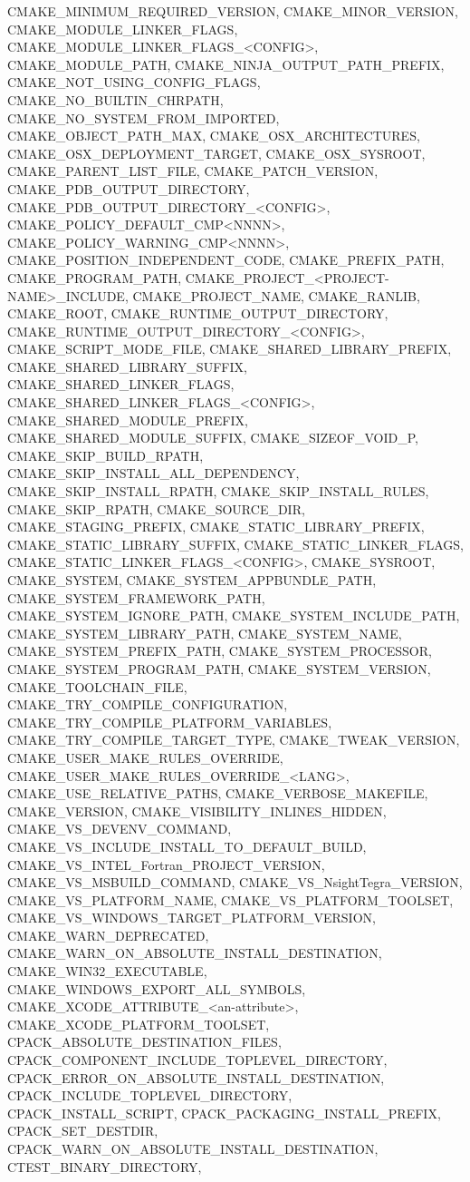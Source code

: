 {{CMAKE_MINIMUM_REQUIRED_VERSION,
CMAKE_MINOR_VERSION,
CMAKE_MODULE_LINKER_FLAGS,
CMAKE_MODULE_LINKER_FLAGS_<CONFIG>,
CMAKE_MODULE_PATH,
CMAKE_NINJA_OUTPUT_PATH_PREFIX,
CMAKE_NOT_USING_CONFIG_FLAGS,
CMAKE_NO_BUILTIN_CHRPATH,
CMAKE_NO_SYSTEM_FROM_IMPORTED,
CMAKE_OBJECT_PATH_MAX,
CMAKE_OSX_ARCHITECTURES,
CMAKE_OSX_DEPLOYMENT_TARGET,
CMAKE_OSX_SYSROOT,
CMAKE_PARENT_LIST_FILE,
CMAKE_PATCH_VERSION,
CMAKE_PDB_OUTPUT_DIRECTORY,
CMAKE_PDB_OUTPUT_DIRECTORY_<CONFIG>,
CMAKE_POLICY_DEFAULT_CMP<NNNN>,
CMAKE_POLICY_WARNING_CMP<NNNN>,
CMAKE_POSITION_INDEPENDENT_CODE,
CMAKE_PREFIX_PATH,
CMAKE_PROGRAM_PATH,
CMAKE_PROJECT_<PROJECT-NAME>_INCLUDE,
CMAKE_PROJECT_NAME,
CMAKE_RANLIB,
CMAKE_ROOT,
CMAKE_RUNTIME_OUTPUT_DIRECTORY,
CMAKE_RUNTIME_OUTPUT_DIRECTORY_<CONFIG>,
CMAKE_SCRIPT_MODE_FILE,
CMAKE_SHARED_LIBRARY_PREFIX,
CMAKE_SHARED_LIBRARY_SUFFIX,
CMAKE_SHARED_LINKER_FLAGS,
CMAKE_SHARED_LINKER_FLAGS_<CONFIG>,
CMAKE_SHARED_MODULE_PREFIX,
CMAKE_SHARED_MODULE_SUFFIX,
CMAKE_SIZEOF_VOID_P,
CMAKE_SKIP_BUILD_RPATH,
CMAKE_SKIP_INSTALL_ALL_DEPENDENCY,
CMAKE_SKIP_INSTALL_RPATH,
CMAKE_SKIP_INSTALL_RULES,
CMAKE_SKIP_RPATH,
CMAKE_SOURCE_DIR,
CMAKE_STAGING_PREFIX,
CMAKE_STATIC_LIBRARY_PREFIX,
CMAKE_STATIC_LIBRARY_SUFFIX,
CMAKE_STATIC_LINKER_FLAGS,
CMAKE_STATIC_LINKER_FLAGS_<CONFIG>,
CMAKE_SYSROOT,
CMAKE_SYSTEM,
CMAKE_SYSTEM_APPBUNDLE_PATH,
CMAKE_SYSTEM_FRAMEWORK_PATH,
CMAKE_SYSTEM_IGNORE_PATH,
CMAKE_SYSTEM_INCLUDE_PATH,
CMAKE_SYSTEM_LIBRARY_PATH,
CMAKE_SYSTEM_NAME,
CMAKE_SYSTEM_PREFIX_PATH,
CMAKE_SYSTEM_PROCESSOR,
CMAKE_SYSTEM_PROGRAM_PATH,
CMAKE_SYSTEM_VERSION,
CMAKE_TOOLCHAIN_FILE,
CMAKE_TRY_COMPILE_CONFIGURATION,
CMAKE_TRY_COMPILE_PLATFORM_VARIABLES,
CMAKE_TRY_COMPILE_TARGET_TYPE,
CMAKE_TWEAK_VERSION,
CMAKE_USER_MAKE_RULES_OVERRIDE,
CMAKE_USER_MAKE_RULES_OVERRIDE_<LANG>,
CMAKE_USE_RELATIVE_PATHS,
CMAKE_VERBOSE_MAKEFILE,
CMAKE_VERSION,
CMAKE_VISIBILITY_INLINES_HIDDEN,
CMAKE_VS_DEVENV_COMMAND,
CMAKE_VS_INCLUDE_INSTALL_TO_DEFAULT_BUILD,
CMAKE_VS_INTEL_Fortran_PROJECT_VERSION,
CMAKE_VS_MSBUILD_COMMAND,
CMAKE_VS_NsightTegra_VERSION,
CMAKE_VS_PLATFORM_NAME,
CMAKE_VS_PLATFORM_TOOLSET,
CMAKE_VS_WINDOWS_TARGET_PLATFORM_VERSION,
CMAKE_WARN_DEPRECATED,
CMAKE_WARN_ON_ABSOLUTE_INSTALL_DESTINATION,
CMAKE_WIN32_EXECUTABLE,
CMAKE_WINDOWS_EXPORT_ALL_SYMBOLS,
CMAKE_XCODE_ATTRIBUTE_<an-attribute>,
CMAKE_XCODE_PLATFORM_TOOLSET,
CPACK_ABSOLUTE_DESTINATION_FILES,
CPACK_COMPONENT_INCLUDE_TOPLEVEL_DIRECTORY,
CPACK_ERROR_ON_ABSOLUTE_INSTALL_DESTINATION,
CPACK_INCLUDE_TOPLEVEL_DIRECTORY,
CPACK_INSTALL_SCRIPT,
CPACK_PACKAGING_INSTALL_PREFIX,
CPACK_SET_DESTDIR,
CPACK_WARN_ON_ABSOLUTE_INSTALL_DESTINATION,
CTEST_BINARY_DIRECTORY,
}}
